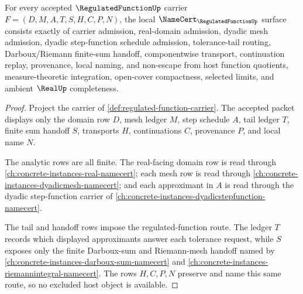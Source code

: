 \begin{theorem}
\label{thm:regulated-function-namecert-obligations}
For every accepted $\RegulatedFunctionUp$ carrier $F=(D,M,A,T,S,H,C,P,N)$, the local $\NameCert_{\RegulatedFunctionUp}$ surface consists exactly of carrier admission, real-domain admission, dyadic mesh admission, dyadic step-function schedule admission, tolerance-tail routing, Darboux/Riemann finite-sum handoff, componentwise transport, continuation replay, provenance, local naming, and non-escape from host function quotients, measure-theoretic integration, open-cover compactness, selected limits, and ambient $\RealUp$ completeness.
\end{theorem}
\begin{proof}
Project the carrier of \autoref{def:regulated-function-carrier}. The accepted packet displays only the domain row $D$, mesh ledger $M$, step schedule $A$, tail ledger $T$, finite sum handoff $S$, transports $H$, continuations $C$, provenance $P$, and local name $N$.

The analytic rows are all finite. The real-facing domain row is read through \autoref{ch:concrete-instances-real-namecert}; each mesh row is read through \autoref{ch:concrete-instances-dyadicmesh-namecert}; and each approximant in $A$ is read through the dyadic step-function carrier of \autoref{ch:concrete-instances-dyadicstepfunction-namecert}.

The tail and handoff rows impose the regulated-function route. The ledger $T$ records which displayed approximants answer each tolerance request, while $S$ exposes only the finite Darboux-sum and Riemann-mesh handoff named by \autoref{ch:concrete-instances-darboux-sum-namecert} and \autoref{ch:concrete-instances-riemannintegral-namecert}. The rows $H,C,P,N$ preserve and name this same route, so no excluded host object is available.
\end{proof}

